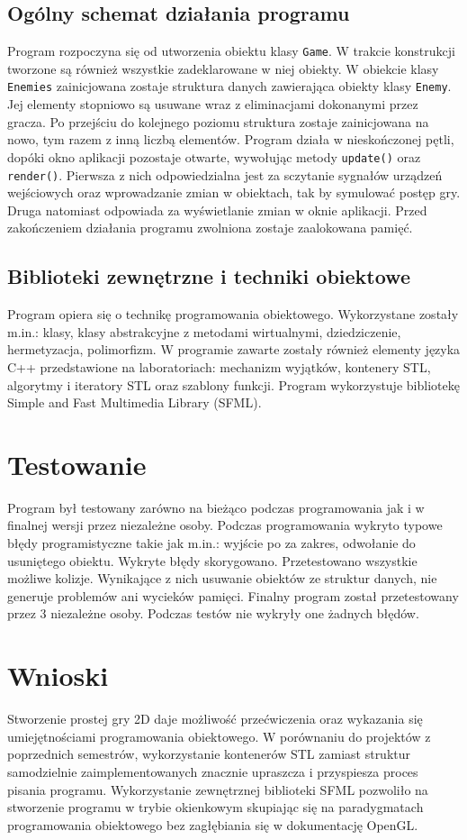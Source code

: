 \documentclass[12pt,a4paper]{article}
\begin{document}
\subsection{Ogólny schemat działania programu}
Program rozpoczyna się od utworzenia obiektu klasy \lstinline|Game|. W trakcie konstrukcji tworzone są również wszystkie zadeklarowane w niej obiekty. W obiekcie klasy \lstinline|Enemies| zainicjowana zostaje struktura danych zawierająca obiekty klasy \lstinline|Enemy|. Jej elementy stopniowo są usuwane wraz z eliminacjami dokonanymi przez gracza. Po przejściu do kolejnego poziomu struktura zostaje zainicjowana na nowo, tym razem z inną liczbą elementów. Program działa w nieskończonej pętli, dopóki okno aplikacji pozostaje otwarte, wywołując metody \lstinline|update()| oraz \lstinline|render()|. Pierwsza z nich odpowiedzialna jest za sczytanie sygnałów urządzeń wejściowych oraz wprowadzanie zmian w obiektach, tak by symulować postęp gry. Druga natomiast odpowiada za wyświetlanie zmian w oknie aplikacji. Przed zakończeniem działania programu zwolniona zostaje zaalokowana pamięć.

\subsection{Biblioteki zewnętrzne i techniki obiektowe}
Program opiera się o technikę programowania obiektowego. Wykorzystane zostały m.in.: klasy, klasy abstrakcyjne z metodami wirtualnymi, dziedziczenie, hermetyzacja, polimorfizm. W programie zawarte zostały również elementy języka C++ przedstawione na laboratoriach: mechanizm wyjątków, kontenery STL, algorytmy i iteratory STL oraz szablony funkcji. Program wykorzystuje bibliotekę Simple and Fast Multimedia Library (SFML).


\section{Testowanie}
Program był testowany zarówno na bieżąco podczas programowania jak i w finalnej wersji przez niezależne osoby. Podczas programowania wykryto typowe błędy programistyczne  takie jak m.in.: wyjście po za zakres, odwołanie do usuniętego obiektu. Wykryte błędy skorygowano. Przetestowano wszystkie możliwe kolizje. Wynikające z nich usuwanie obiektów ze struktur danych, nie generuje problemów ani wycieków pamięci. Finalny program został przetestowany przez 3 niezależne osoby. Podczas testów nie wykryły one żadnych błędów. 

\section{Wnioski}
Stworzenie prostej gry 2D daje możliwość przećwiczenia oraz wykazania się umiejętnościami programowania obiektowego. W porównaniu do projektów z poprzednich semestrów, wykorzystanie kontenerów STL zamiast struktur samodzielnie zaimplementowanych znacznie upraszcza i przyspiesza proces pisania programu. Wykorzystanie zewnętrznej biblioteki SFML pozwoliło na stworzenie programu w trybie okienkowym skupiając się na paradygmatach programowania obiektowego bez zagłębiania się w dokumentację OpenGL.
\end{document}
